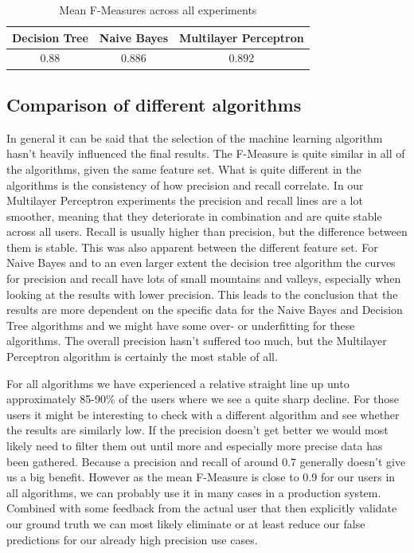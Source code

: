 \begin{table}[H]	
	\begin{center}
		\begin{tabular}{c | c | c}
			Decision Tree & Naive Bayes & Multilayer Perceptron \\
			\hline
			0.88  & 0.886 & 0.892 \\
		\end{tabular}
	\end{center}
	\caption{Mean F-Measures across all experiments}
	\label{table:mean_f_measures}
\end{table}

\subsection{Comparison of different algorithms}
In general it can be said that the selection of the machine learning algorithm hasn't heavily influenced the final results. The F-Measure is quite similar in all of the algorithms, given the same feature set. What is quite different in the algorithms is the consistency of how precision and recall correlate. In our Multilayer Perceptron experiments the precision and recall lines are a lot smoother, meaning that they deteriorate in combination and are quite stable across all users. Recall is usually higher than precision, but the difference between them is stable. This was also apparent between the different feature set. For Naive Bayes and to an even larger extent the decision tree algorithm the curves for precision and recall have lots of small mountains and valleys, especially when looking at the results with lower precision. This leads to the conclusion that the results are more dependent on the specific data for the Naive Bayes and Decision Tree algorithms and we might have some over- or underfitting for these algorithms. The overall precision hasn't suffered too much, but the Multilayer Perceptron algorithm is certainly the most stable of all.

For all algorithms we have experienced a relative straight line up unto approximately 85-90\% of the users where we see a quite sharp decline. For those users it might be interesting to check with a different algorithm and see whether the results are similarly low. If the precision doesn't get better we would most likely need to filter them out until more and especially more precise data has been gathered. Because a precision and recall of around 0.7 generally doesn't give us a big benefit. However as the mean F-Measure is close to 0.9 for our users in all algorithms, we can probably use it in many cases in a production system. Combined with some feedback from the actual user that then explicitly validate our ground truth we can most likely eliminate or at least reduce our false predictions for our already high precision use cases.

